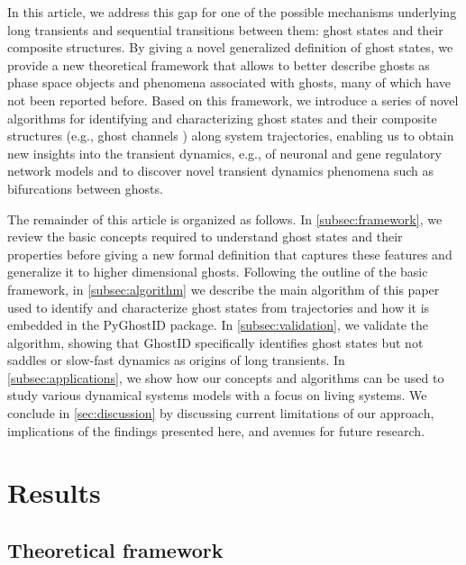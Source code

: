 \documentclass{article}
\theoremstyle{definition}
\begin{document}
\begin{refsection}
In this article, we address this gap for one of the possible mechanisms underlying long transients and sequential transitions between them: ghost states and their composite structures. By giving a novel generalized definition of ghost states, we provide a new theoretical framework that allows to better describe ghosts as phase space objects and phenomena associated with ghosts, many of which have not been reported before. Based on this framework, we introduce a series of novel algorithms for identifying and characterizing ghost states and their composite structures (e.g., ghost channels \cite{Koch_2024}) along system trajectories, enabling us to obtain new insights into the transient dynamics, e.g., of neuronal and gene regulatory network models and to discover novel transient dynamics phenomena such as bifurcations between ghosts.


The remainder of this article is organized as follows. In \autoref{subsec:framework}, we review the basic concepts required to understand ghost states and their properties before giving a new formal definition that captures these features and generalize it to higher dimensional ghosts. Following the outline of the basic framework, in \autoref{subsec:algorithm} we describe the main algorithm of this paper used to identify and characterize ghost states from trajectories and how it is embedded in the PyGhostID package. In \autoref{subsec:validation}, we validate the algorithm, showing that GhostID specifically identifies ghost states but not saddles or slow-fast dynamics as origins of long transients. In \autoref{subsec:applications}, we show how our concepts and algorithms can be used to study various dynamical systems models with a focus on living systems. We conclude in \autoref{sec:discussion} by discussing current limitations of our approach, implications of the findings presented here, and avenues for future research.


\section{Results}\label{sec:results}
\subsection{Theoretical framework}\label{subsec:framework}


\end{refsection}
\end{document}

